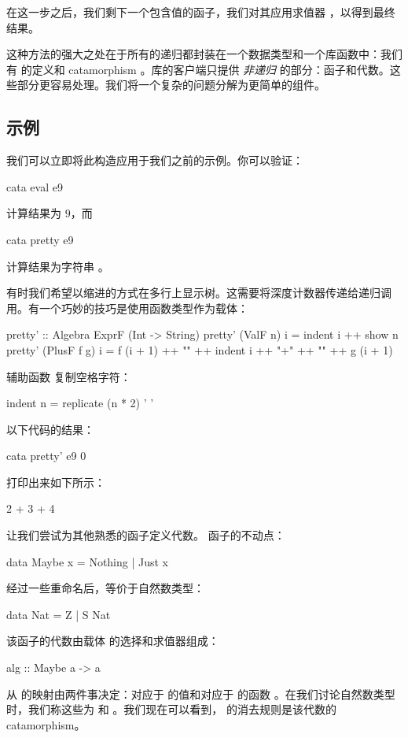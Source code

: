 \documentclass[DaoFP]{subfiles}
\begin{document}
在这一步之后，我们剩下一个包含值的函子，我们对其应用求值器 ，以得到最终结果。

这种方法的强大之处在于所有的递归都封装在一个数据类型和一个库函数中：我们有  的定义和 catamorphism 。库的客户端只提供 \emph{非递归} 的部分：函子和代数。这些部分更容易处理。我们将一个复杂的问题分解为更简单的组件。

\subsection{示例}

我们可以立即将此构造应用于我们之前的示例。你可以验证：
\begin{haskell}
cata eval e9
\end{haskell}
计算结果为 $9$，而
\begin{haskell}
cata pretty e9
\end{haskell}
计算结果为字符串 。

有时我们希望以缩进的方式在多行上显示树。这需要将深度计数器传递给递归调用。有一个巧妙的技巧是使用函数类型作为载体：
\begin{haskell}
pretty' :: Algebra ExprF (Int -> String)
pretty' (ValF n) i = indent i ++ show n
pretty' (PlusF f g) i = f (i + 1) ++ "\n" ++
                        indent i ++ "+" ++ "\n" ++
                        g (i + 1)
\end{haskell}
辅助函数  复制空格字符：
\begin{haskell}
indent n = replicate (n * 2) ' '
\end{haskell}
以下代码的结果：
\begin{haskell}
cata pretty' e9 0
\end{haskell}
打印出来如下所示：
\begin{haskell}
    2
  +
    3
+
  4
\end{haskell}

让我们尝试为其他熟悉的函子定义代数。 函子的不动点：
\begin{haskell}
data Maybe x = Nothing | Just x
\end{haskell}
经过一些重命名后，等价于自然数类型：
\begin{haskell}
data Nat = Z | S Nat
\end{haskell}
该函子的代数由载体  的选择和求值器组成：
\begin{haskell}
alg :: Maybe a -> a
\end{haskell}
从  的映射由两件事决定：对应于  的值和对应于  的函数 。在我们讨论自然数类型时，我们称这些为  和 。我们现在可以看到， 的消去规则是该代数的 catamorphism。
\end{document}
